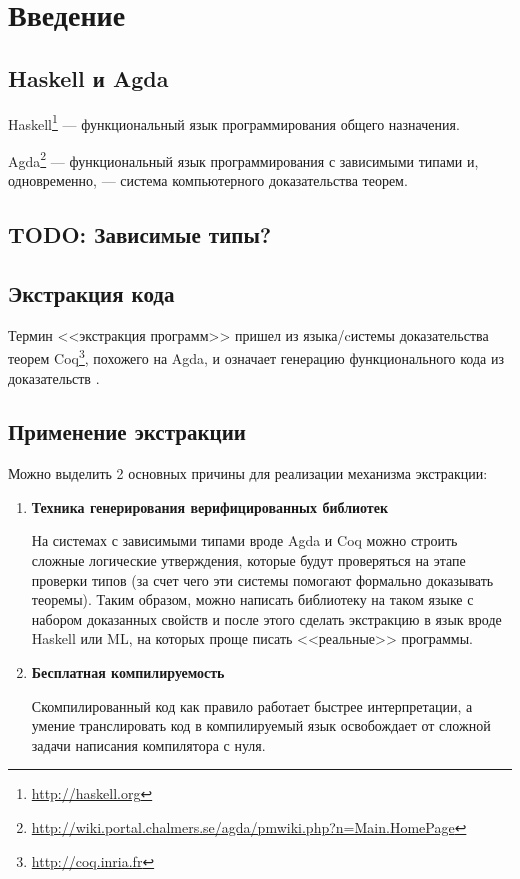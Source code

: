 \section{Введение}

\subsection{Haskell и Agda}

Haskell\footnote{\url{http://haskell.org}} --- функциональный язык программирования
общего назначения.

Agda\footnote{\url{http://wiki.portal.chalmers.se/agda/pmwiki.php?n=Main.HomePage}} ---
функциональный язык программирования с зависимыми типами и, одновременно, ---
система компьютерного доказательства теорем.

\subsection{TODO: Зависимые типы?}

\subsection{Экстракция кода}\label{sec:intro-extraction}

Термин <<экстракция программ>> пришел из языка/cистемы доказательства теорем
Coq\footnote{\url{http://coq.inria.fr}}, похожего на Agda, и означает генерацию функционального кода
из доказательств \cite{Let02}.

\subsection{Применение экстракции}

Можно выделить 2 основных причины для реализации механизма экстракции:
\begin{enumerate}
\item \textbf{Техника генерирования верифицированных библиотек}

      На системах с зависимыми типами вроде Agda и Coq можно строить
      сложные логические утверждения, которые будут проверяться на этапе
      проверки типов (за счет чего эти системы помогают формально доказывать теоремы).
      Таким образом, можно написать библиотеку на таком языке с набором доказанных
      свойств и после этого сделать экстракцию в язык вроде Haskell или ML,
      на которых проще писать <<реальные>> программы.

\item \textbf{Бесплатная компилируемость}

      Скомпилированный код как правило работает быстрее интерпретации, а умение
      транслировать код в компилируемый язык освобождает от сложной задачи
      написания компилятора с нуля.
\end{enumerate}

